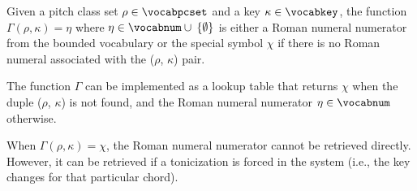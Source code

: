 
Given a pitch class set $\rho \in \vocabpcset$ and a key
$\kappa \in \vocabkey$, the function $\Gamma(\rho, \kappa) =
\eta$ where $\eta \in \vocabnum \cup \: \{ \emptyset \}$ is
either a Roman numeral numerator from the bounded vocabulary
or the special symbol $\chi$ if there is no Roman numeral
associated with the ($\rho$, $\kappa$) pair.

The function $\Gamma$ can be implemented as a lookup table
that returns $\chi$ when the duple ($\rho$, $\kappa$) is not
found, and the Roman numeral numerator $\eta \in \vocabnum$
otherwise.

When $\Gamma(\rho, \kappa) = \chi$, the Roman numeral
numerator cannot be retrieved directly. However, it can be
retrieved if a tonicization is forced in the system (i.e.,
the key changes for that particular chord).

